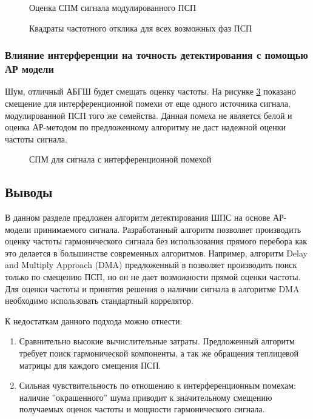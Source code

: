 \begin{figure}[H]
	\center{}
	\caption{Оценка СПМ сигнала модулированного ПСП}
	\label{pic:lpc_psd_1}
\end{figure}
\begin{figure}[H]
	\center{}
	\caption{Квадраты частотного отклика для всех возможных фаз ПСП}
	\label{pic:lpc_1sat_energy}
\end{figure}



\subsubsection{Влияние интерференции на точность детектирования с помощью АР модели}
Шум, отличный АБГШ будет смещать оценку частоты. На рисунке \ref{pic:lpc_2sat_psd} показано
смещение для интерференционной помехи от еще одного источника сигнала, модулированной ПСП того же семейства.
Данная помеха не является белой и оценка АР-методом по предложенному алгоритму не даст надежной оценки частоты сигнала.

\begin{figure}[H]
	\center{}
	\caption{СПМ для сигнала с интерференционной помехой}
	\label{pic:lpc_2sat_psd}
\end{figure}

\subsection*{Выводы}
\label{ssec:sec3_lpc_conclusion}

В данном разделе предложен алгоритм детектирования ШПС на основе АР-модели принимаемого сигнала.
Разработанный алгоритм позволяет производить оценку частоты гармонического сигнала без использования прямого
перебора как это делается в большинстве современных алгоритмов. Например, алгоритм Delay and Multiply Approach (DMA) предложенный в 
\cite{lin_dma, tsui} позволяет производить поиск только по смещению ПСП, но он не дает возможности прямой оценки частоты.
Для оценки частоты и принятия решения о наличии сигнала в алгоритме DMA необходимо использовать стандартный коррелятор.

К недостаткам данного подхода можно отнести: 
\begin{enumerate}
	\item Сравнительно высокие вычислительные затраты. Предложенный алгоритм требует поиск гармонической
		компоненты, а так же обращения теплицевой матрицы для каждого смещения ПСП.
	\item Сильная чувствительность по отношению к интерференционным помехам: наличие
		''окрашенного'' шума приводит к значительному смещению получаемых
		оценок частоты и мощности гармонического сигнала.
\end{enumerate}

